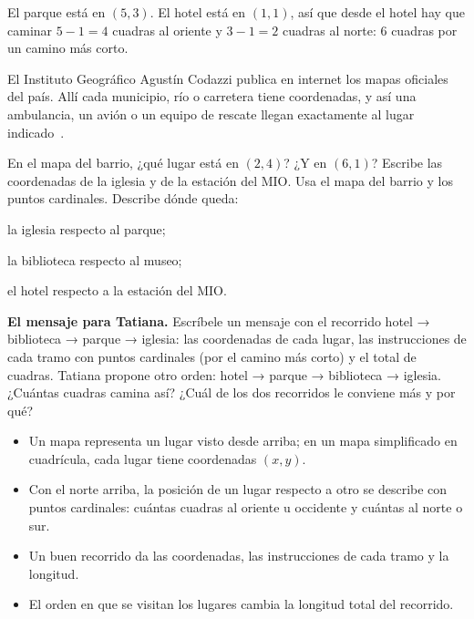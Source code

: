 \documentclass[11pt]{article}
\begin{document}
\begin{ejemplo}
El parque está en $(5, 3)$. El hotel está en $(1, 1)$, así que desde el hotel hay que caminar
$5 - 1 = 4$ cuadras al oriente y $3 - 1 = 2$ cuadras al norte: 6 cuadras por un camino más
corto.
\end{ejemplo}

\begin{aplicacion}
El Instituto Geográfico Agustín Codazzi publica en internet los mapas oficiales del país. Allí
cada municipio, río o carretera tiene coordenadas, y así una ambulancia, un avión o un equipo
de rescate llegan exactamente al lugar indicado~\cite{igac}.
\end{aplicacion}

\begin{preguntas}
\pregunta En el mapa del barrio, ¿qué lugar está en $(2, 4)$? ¿Y en $(6, 1)$? Escribe las
coordenadas de la iglesia y de la estación del MIO.
\pregunta Usa el mapa del barrio y los puntos cardinales. Describe dónde queda:
\begin{opciones}
  \item la iglesia respecto al parque;
  \item la biblioteca respecto al museo;
  \item el hotel respecto a la estación del MIO.
\end{opciones}
\pregunta \textbf{El mensaje para Tatiana.} Escríbele un mensaje con el recorrido hotel →
biblioteca → parque → iglesia: las coordenadas de cada lugar, las instrucciones de cada tramo
con puntos cardinales (por el camino más corto) y el total de cuadras.
\pregunta Tatiana propone otro orden: hotel → parque → biblioteca → iglesia. ¿Cuántas cuadras
camina así? ¿Cuál de los dos recorridos le conviene más y por qué?
\end{preguntas}

\begin{resumen}
\begin{itemize}
  \item Un mapa representa un lugar visto desde arriba; en un mapa simplificado en cuadrícula,
        cada lugar tiene coordenadas $(x, y)$.
  \item Con el norte arriba, la posición de un lugar respecto a otro se describe con puntos
        cardinales: cuántas cuadras al oriente u occidente y cuántas al norte o sur.
  \item Un buen recorrido da las coordenadas, las instrucciones de cada tramo y la longitud.
  \item El orden en que se visitan los lugares cambia la longitud total del recorrido.
\end{itemize}
\end{resumen}
\end{document}
